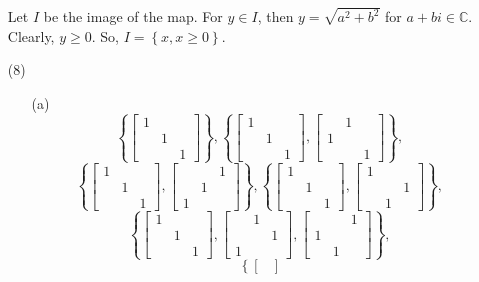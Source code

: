 \documentclass[12pt]{article}
\begin{document}
\begin{itemize}
Let $I$ be the image of the map. For $y \in I$, then $y = \sqrt{a^2 + b^2}$ for $a + bi \in \mathbb{C}$. Clearly, $y \geq 0$. So, $I = \left\lbrace x, x \geq 0 \right\rbrace$.
\item[(8)]
\begin{itemize}
\item[(a)]
$$\left\lbrace \begin{bmatrix}
1 \\
& 1 \\
& & 1
\end{bmatrix} \right\rbrace, \left\lbrace \begin{bmatrix}
1 \\
& 1 \\
& & 1
\end{bmatrix}, \begin{bmatrix}
& 1 \\
1 \\
& & 1
\end{bmatrix} \right\rbrace,$$
$$\left\lbrace \begin{bmatrix}
1 \\
& 1 \\
& & 1
\end{bmatrix}, \begin{bmatrix}
& & 1 \\
& 1 \\
1
\end{bmatrix} \right\rbrace, \left\lbrace \begin{bmatrix}
1 \\
& 1 \\
& & 1
\end{bmatrix}, \begin{bmatrix}
1 \\
& & 1 \\
& 1
\end{bmatrix} \right\rbrace,$$
$$\left\lbrace \begin{bmatrix}
1 \\
& 1 \\
& & 1
\end{bmatrix}, \begin{bmatrix}
& 1 \\
& & 1 \\
1
\end{bmatrix}, \begin{bmatrix}
& & 1 \\
1 \\
& 1
\end{bmatrix} \right\rbrace,$$
$$\left\lbrace \begin{bmatrix}

\end{bmatrix}$$
\end{itemize}
\end{itemize}
\end{document}
